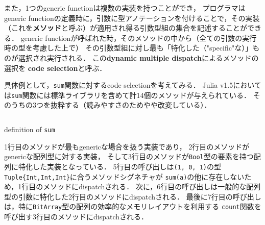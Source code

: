 
また，1つのgeneric functionは複数の実装を持つことができ，
プログラマはgeneric functionの定義時に，引数に型アノテーションを付けることで，その実装
（これを\textbf{メソッド}と呼ぶ）が適用され得る引数型組の集合を記述することができる．
generic functionが呼ばれた時，そのメソッドの中から（全ての引数の実行時の型を考慮した上で）
その引数型組に対し最も「特化した（"specific"\footnotemark な）」ものが選択され実行される．
この\textbf{dynamic multiple dispatch}によるメソッドの選択を
\textbf{code selection}と呼ぶ．


具体例として，\verb|sum|関数に対するcode selectionを考えてみる．
Julia v1.5においては\verb|sum|関数には標準ライブラリを含めて計14個のメソッドが与えられている．
そのうちの3つを抜粋する（読みやすさのためやや改変している）．

\begin{listing}[ht]
  \inputminted[frame=lines, linenos]{julia}{src/sums_method.jl}
  \caption{definition of \texttt{sum}}
  \label{lst:sums}
\end{listing}

1行目のメソッドが最もgenericな場合を扱う実装であり，
2行目のメソッドがgenericな配列型に対する実装，
そして3行目のメソッドが\verb|Bool|型の要素を持つ配列に特化した実装となっている．
5行目の呼び出しは\verb|(1, 0, 1)|の型\verb|Tuple{Int,Int,Int}|に合うメソッドシグネチャが
\verb|sum(a)|の他に存在しないため，1行目のメソッドにdispatchされる．
次に，6行目の呼び出しは一般的な配列型の引数に特化した2行目のメソッドにdispatchされる．
最後に7行目の呼び出しは，特に\verb|BitArray|型の配列の効率的なメモリレイアウトを利用する
\verb|count|関数を呼び出す3行目のメソッドにdispatchされる．

